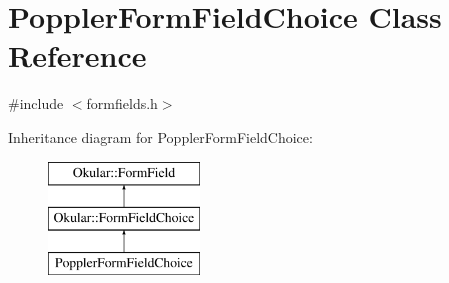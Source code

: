 \hypertarget{classPopplerFormFieldChoice}{\section{Poppler\+Form\+Field\+Choice Class Reference}
\label{classPopplerFormFieldChoice}
}


{\ttfamily \#include $<$formfields.\+h$>$}

Inheritance diagram for Poppler\+Form\+Field\+Choice\+:\begin{figure}[H]
\begin{center}
\leavevmode
\includegraphics[height=3.000000cm]{classPopplerFormFieldChoice}
\end{center}
\end{figure}
